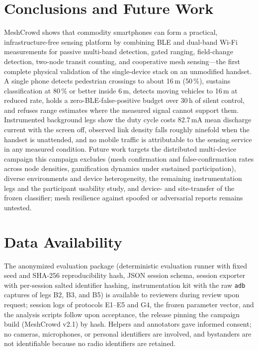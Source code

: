 \documentclass[journal,10pt]{IEEEtran}
\begin{document}
\section{Conclusions and Future Work}
MeshCrowd shows that commodity smartphones can form a practical,
infrastructure-free sensing platform by combining BLE and dual-band Wi-Fi
measurements for passive multi-band detection, gated ranging, field-change
detection, two-node transit counting, and cooperative mesh sensing---the first
complete physical validation of the single-device stack on an unmodified
handset. A single phone detects pedestrian crossings to about 16\,m (50\,\%),
sustains classification at 80\,\% or better inside 6\,m, detects moving vehicles
to 16\,m at reduced rate, holds a zero-BLE-false-positive budget over 30\,h of
silent control, and refuses range estimates where the measured signal cannot
support them. Instrumented background legs show the duty cycle costs 82.7\,mA
mean discharge current with the screen off, observed link density falls
roughly ninefold when the handset is unattended, and no mobile traffic is
attributable to the sensing service in any measured condition. Future work targets the distributed multi-device campaign this campaign
excludes (mesh confirmation and false-confirmation rates across node densities,
gamification dynamics under sustained participation), diverse environments and
device heterogeneity, the remaining instrumentation legs and the participant
usability study, and device- and site-transfer of the frozen classifier; mesh
resilience against spoofed or adversarial reports remains untested.

\section*{Data Availability}
The anonymized evaluation package (deterministic evaluation runner with fixed
seed and SHA-256 reproducibility hash, JSON session schema, session exporter
with per-session salted identifier hashing, instrumentation kit with the raw
\texttt{adb} captures of legs B2, B3, and B5) is available to reviewers
during review upon request; session logs of protocols E1--E5 and G4, the frozen
parameter vector, and the analysis scripts follow upon acceptance, the release
pinning the campaign build (MeshCrowd v2.1) by hash. Helpers and annotators
gave informed consent; no cameras, microphones, or personal identifiers are
involved, and bystanders are not identifiable because no radio identifiers are
retained.
\end{document}
